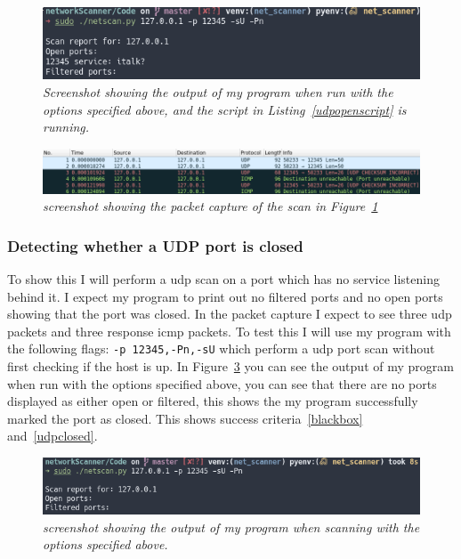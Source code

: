 \documentclass[titlepage]{article}
\let\Oldsubsubsection\subsubsection{}
\renewcommand{\subsubsection}{\FloatBarrier\Oldsubsubsection}
\begin{document}
\begin{figure}[H]
  \centering
  \includegraphics[width=\textwidth]{udpopenoutput.png}
  \caption{\textit{%
    Screenshot showing the output of my program when run with the options specified
    above, and the script in Listing~\ref{udpopenscript} is running.
}}\label{udpopenoutput}
\end{figure}

\begin{figure}[H]
  \centering
  \includegraphics[width=\textwidth]{udpopenpcap.png}
  \caption{\textit{%
    screenshot showing the packet capture of the scan in Figure~\ref{udpopenoutput}
}}\label{udpopenpcap}
\end{figure}

\subsubsection{Detecting whether a UDP port is closed}
To show this I will perform a \gls{udp} scan on a port which
has no service listening behind it. I expect my program to print out
no filtered ports and no open ports showing that the port was closed.
In the packet capture I expect to see three \gls{udp} packets and three response
\gls{icmp} packets. To test this I will use my program with the following flags:
\verb|-p 12345,-Pn,-sU| which perform a \gls{udp} port scan without first checking
if the host is up. In Figure~\ref{udpclosedoutput} you can see the output of my program
when run with the options specified above, you can see that there are no ports displayed
as either open or filtered, this shows the my program successfully marked the port as closed.
This shows success criteria~\ref{blackbox} and~\ref{udpclosed}.

\begin{figure}[H]
  \centering
  \includegraphics[width=\textwidth]{udpclosedoutput.png}
  \caption{\textit{%
    screenshot showing the output of my program when scanning with the
    options specified above.
}}\label{udpclosedoutput}
\end{figure}
\end{document}
